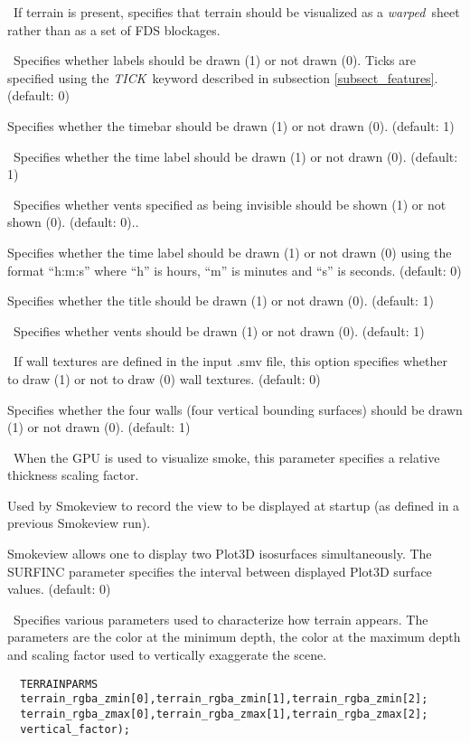 \documentclass[11pt,twoside]{book}
\newcommand{\hitem}[1]{\item[{\bf #1} \hfill]}
\begin{document}
\hitem{SHOWTERRAIN}\ If terrain is present, specifies that terrain
should be visualized as a {\em warped}\ sheet
rather than as a set of FDS blockages.

\hitem{SHOWTICKS}\ Specifies whether labels should be drawn (1) or
not drawn (0).  Ticks are specified using the {\em TICK}\ keyword
described in subsection \ref{subsect_features}. (default: 0)

\hitem{SHOWTIMEBAR}Specifies whether the timebar should be drawn
(1) or not drawn (0). (default: 1)

\hitem{SHOWTIMELABEL}\ Specifies whether the time label should be
drawn (1) or not drawn (0). (default: 1)

\hitem{SHOWTRANSPARENTVENTS}\ Specifies whether vents specified as being invisible should be
shown (1) or not shown (0). (default: 0)..

\hitem{SHOWHMSTIMELABEL}Specifies whether the time label should be
drawn (1) or not drawn (0) using the format ``h:m:s'' where ``h''
is hours, ``m'' is minutes and ``s'' is seconds.  (default: 0)

\hitem{SHOWTITLE}Specifies whether
the title should be drawn (1) or not drawn (0).
(default: 1)

\hitem{SHOWVENTS}\ Specifies whether vents should be drawn
(1) or not drawn (0).  (default: 1)

\hitem{SHOWALLTEXTURES}\ If wall textures are defined in the input .smv file, this
option specifies whether to draw (1) or not to draw (0) wall textures.
(default: 0)


\hitem{SHOWWALLS}Specifies whether
the four walls (four vertical bounding surfaces) should be drawn (1) or not drawn (0).
(default: 1)

\hitem{SMOKERTHICK}\ When the GPU is used to visualize smoke, this parameter specifies a
relative thickness scaling factor.

\hitem{STARTUPVIEW}Used by Smokeview to record the view to be
displayed at startup (as defined in a previous Smokeview run).

\hitem{SURFINC}Smokeview allows one to display two Plot3D
isosurfaces simultaneously.  The SURFINC parameter specifies the
interval between displayed Plot3D surface values. (default: 0)

\hitem{TERRAINPARMS}\ Specifies various parameters used to characterize
how terrain appears.  The parameters are the color at the minimum depth,
the color at the maximum depth and scaling factor used to vertically exaggerate
the scene.
\begin{lstlisting}
  TERRAINPARMS
  terrain_rgba_zmin[0],terrain_rgba_zmin[1],terrain_rgba_zmin[2];
  terrain_rgba_zmax[0],terrain_rgba_zmax[1],terrain_rgba_zmax[2];
  vertical_factor);
\end{lstlisting}
\end{document}
